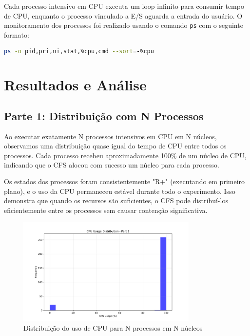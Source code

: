\documentclass[12pt,a4paper]{article}
\begin{document}
Cada processo intensivo em CPU executa um loop infinito para consumir tempo de CPU, enquanto o processo vinculado a E/S aguarda a entrada do usuário. O monitoramento dos processos foi realizado usando o comando \texttt{ps} com o seguinte formato:

\begin{lstlisting}[language=bash]
ps -o pid,pri,ni,stat,%cpu,cmd --sort=-%cpu
\end{lstlisting}

\section{Resultados e Análise}

\subsection{Parte 1: Distribuição com N Processos}

Ao executar exatamente N processos intensivos em CPU em N núcleos, observamos uma distribuição quase igual do tempo de CPU entre todos os processos. Cada processo recebeu aproximadamente 100\% de um núcleo de CPU, indicando que o CFS alocou com sucesso um núcleo para cada processo.

Os estados dos processos foram consistentemente "R+" (executando em primeiro plano), e o uso da CPU permaneceu estável durante todo o experimento. Isso demonstra que quando os recursos são suficientes, o CFS pode distribuí-los eficientemente entre os processos sem causar contenção significativa.

\begin{figure}[H]
    \centering
    \includegraphics[width=0.8\textwidth]{figures/cpu_dist_part1.pdf}
    \caption{Distribuição do uso de CPU para N processos em N núcleos}
    \label{fig:part1_cpu}
\end{figure}
\end{document}
